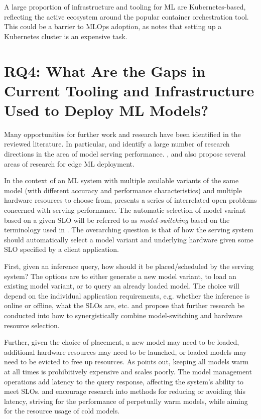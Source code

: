 A large proportion of infrastructure and tooling for ML are Kubernetes-based, reflecting the active ecosystem around the popular container orchestration tool.
This could be a barrier to MLOps adoption, as \textcite{Ruf2021} notes that setting up a Kubernetes cluster is an expensive task.

\section{RQ4: What Are the Gaps in Current Tooling and Infrastructure Used to Deploy ML Models?}
\label{ch:research_results:rq4_gaps}

Many opportunities for further work and research have been identified in the reviewed literature.
In particular, \cite{Yadwadkar2019} and \cite{Zhang2020} identify a large number of research directions in the area of model serving performance.
\cite{Bosch2021}, \cite{Rausch2019} and \cite{Gupta2020} also propose several areas of research for edge ML deployment.

In the context of an ML system with multiple available variants of the same model (with different accuracy and performance characteristics) and multiple hardware resources to choose from, \cite{Yadwadkar2019} presents a series of interrelated open problems concerned with serving performance.
The automatic selection of model variant based on a given SLO will be referred to as \textit{model-switching} based on the terminology used in \cite{Zhang2020}. 
The overarching question is that of how the serving system should automatically select a model variant and underlying hardware given some SLO specified by a client application.

First, given an inference query, how should it be placed/scheduled by the serving system?
The options are to either generate a new model variant, to load an existing model variant, or to query an already loaded model.
The choice will depend on the individual application requirements, e.g. whether the inference is online or offline, what the SLOs are, etc.
\cite{Yadwadkar2019} and \cite{Zhang2020} propose that further research be conducted into how to synergistically combine model-switching and hardware resource selection.

Further, given the choice of placement, a new model may need to be loaded, additional hardware resources may need to be launched, or loaded models may need to be evicted to free up resources.
As \cite{Zhang2020} points out, keeping all models warm at all times is prohibitively expensive and scales poorly.
The model management operations add latency to the query response, affecting the system's ability to meet SLOs.
\cite{Yadwadkar2019} and \cite{Zhang2020} encourage research into methods for reducing or avoiding this latency, striving for the performance of perpetually warm models, while aiming for the resource usage of cold models.

